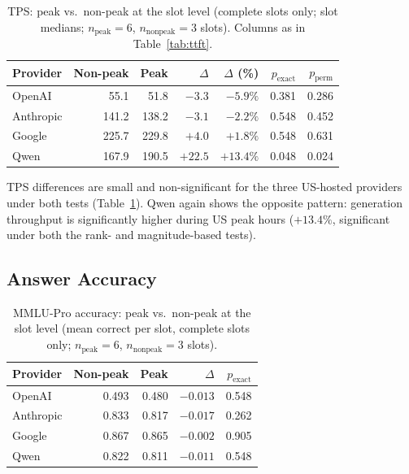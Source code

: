 \documentclass[11pt]{article}
\begin{document}
\begin{table}[h]
\centering
\caption{TPS: peak vs.\ non-peak at the slot level (complete slots only; slot medians;
$n_\text{peak}=6$, $n_\text{nonpeak}=3$ slots). Columns as in Table~\ref{tab:ttft}.}
\label{tab:tps}
\begin{tabular}{lrrrrrr}
\toprule
\textbf{Provider} & \textbf{Non-peak} & \textbf{Peak}
  & \textbf{$\Delta$} & \textbf{$\Delta$ (\%)}
  & \textbf{$p_\text{exact}$} & \textbf{$p_\text{perm}$} \\
\midrule
OpenAI    & 55.1  & 51.8  & $-3.3$  & $-5.9\%$ & 0.381 & 0.286 \\
Anthropic & 141.2 & 138.2 & $-3.1$  & $-2.2\%$ & 0.548 & 0.452 \\
Google    & 225.7 & 229.8 & $+4.0$  & $+1.8\%$ & 0.548 & 0.631 \\
Qwen      & 167.9 & 190.5 & $+22.5$ & $+13.4\%$ & 0.048 & 0.024 \\
\bottomrule
\end{tabular}
\end{table}

TPS differences are small and non-significant for the three US-hosted providers under both
tests (Table~\ref{tab:tps}).
Qwen again shows the opposite pattern: generation throughput is significantly higher during
US peak hours ($+13.4\%$, significant under both the rank- and magnitude-based tests).

\subsection{Answer Accuracy}
\label{sec:accuracy}

\begin{table}[h]
\centering
\caption{MMLU-Pro accuracy: peak vs.\ non-peak at the slot level (mean correct per slot,
complete slots only; $n_\text{peak}=6$, $n_\text{nonpeak}=3$ slots).}
\label{tab:accuracy}
\begin{tabular}{lrrrr}
\toprule
\textbf{Provider} & \textbf{Non-peak} & \textbf{Peak}
  & \textbf{$\Delta$} & \textbf{$p_\text{exact}$} \\
\midrule
OpenAI    & 0.493 & 0.480 & $-0.013$ & 0.548 \\
Anthropic & 0.833 & 0.817 & $-0.017$ & 0.262 \\
Google    & 0.867 & 0.865 & $-0.002$ & 0.905 \\
Qwen      & 0.822 & 0.811 & $-0.011$ & 0.548 \\
\bottomrule
\end{tabular}
\end{table}
\end{document}
